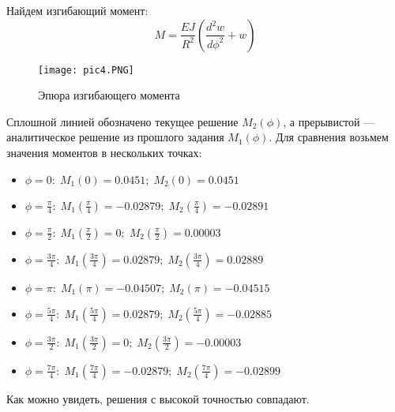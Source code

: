 Найдем изгибающий момент:
\begin{equation}
    \label{eq14}
    M = \frac{EJ}{R^2} \left(\frac{d^2 w}{d \phi^2} + w \right)
\end{equation}

\begin{figure}[H]
    \begin{center}
        \texttt{[image: pic4.PNG]}
        \caption{Эпюра изгибающего момента}
        \label{pic4}
    \end{center}
\end{figure}

Сплошной линией обозначено текущее решение $M_2(\phi)$, а прерывистой --- аналитическое решение из прошлого задания $M_1(\phi)$. Для сравнения возьмем значения моментов в нескольких точках:
\begin{itemize}
    \item $\phi = 0: \; M_1(0) = 0.0451; \; M_2(0) = 0.0451$
    \item $\displaystyle \phi = \frac{\pi}{4}: \; M_1(\frac{\pi}{4}) = -0.02879; \; M_2(\frac{\pi}{4}) = -0.02891$
    \item $\displaystyle \phi = \frac{\pi}{2}: \; M_1(\frac{\pi}{2}) = 0; \; M_2(\frac{\pi}{2}) = 0.00003$
    \item $\displaystyle \phi = \frac{3\pi}{4}: \; M_1(\frac{3\pi}{4}) = 0.02879; \; M_2(\frac{3\pi}{4}) = 0.02889$
    \item $\displaystyle \phi = \pi: \; M_1(\pi) = -0.04507; \; M_2(\pi) = -0.04515$
    \item $\displaystyle \phi = \frac{5\pi}{4}: \; M_1(\frac{5\pi}{4}) = 0.02879; \; M_2(\frac{5\pi}{4}) = -0.02885$
    \item $\displaystyle \phi = \frac{3\pi}{2}: \; M_1(\frac{3\pi}{2}) = 0; \; M_2(\frac{3\pi}{2}) = -0.00003$
    \item $\displaystyle \phi = \frac{7\pi}{4}: \; M_1(\frac{7\pi}{4}) = -0.02879; \; M_2(\frac{7\pi}{4}) = -0.02899$
\end{itemize}

Как можно увидеть, решения с высокой точностью совпадают.